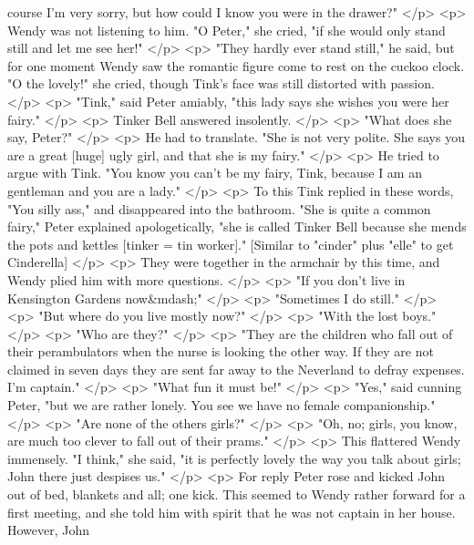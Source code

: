       course I'm very sorry, but how could I know you were in the drawer?"
    </p>
    <p>
      Wendy was not listening to him. "O Peter," she cried, "if she would only
      stand still and let me see her!"
    </p>
    <p>
      "They hardly ever stand still," he said, but for one moment Wendy saw the
      romantic figure come to rest on the cuckoo clock. "O the lovely!" she
      cried, though Tink's face was still distorted with passion.
    </p>
    <p>
      "Tink," said Peter amiably, "this lady says she wishes you were her
      fairy."
    </p>
    <p>
      Tinker Bell answered insolently.
    </p>
    <p>
      "What does she say, Peter?"
    </p>
    <p>
      He had to translate. "She is not very polite. She says you are a great
      [huge] ugly girl, and that she is my fairy."
    </p>
    <p>
      He tried to argue with Tink. "You know you can't be my fairy, Tink,
      because I am an gentleman and you are a lady."
    </p>
    <p>
      To this Tink replied in these words, "You silly ass," and disappeared into
      the bathroom. "She is quite a common fairy," Peter explained
      apologetically, "she is called Tinker Bell because she mends the pots and
      kettles [tinker = tin worker]." [Similar to "cinder" plus "elle" to get
      Cinderella]
    </p>
    <p>
      They were together in the armchair by this time, and Wendy plied him with
      more questions.
    </p>
    <p>
      "If you don't live in Kensington Gardens now&mdash;"
    </p>
    <p>
      "Sometimes I do still."
    </p>
    <p>
      "But where do you live mostly now?"
    </p>
    <p>
      "With the lost boys."
    </p>
    <p>
      "Who are they?"
    </p>
    <p>
      "They are the children who fall out of their perambulators when the nurse
      is looking the other way. If they are not claimed in seven days they are
      sent far away to the Neverland to defray expenses. I'm captain."
    </p>
    <p>
      "What fun it must be!"
    </p>
    <p>
      "Yes," said cunning Peter, "but we are rather lonely. You see we have no
      female companionship."
    </p>
    <p>
      "Are none of the others girls?"
    </p>
    <p>
      "Oh, no; girls, you know, are much too clever to fall out of their prams."
    </p>
    <p>
      This flattered Wendy immensely. "I think," she said, "it is perfectly
      lovely the way you talk about girls; John there just despises us."
    </p>
    <p>
      For reply Peter rose and kicked John out of bed, blankets and all; one
      kick. This seemed to Wendy rather forward for a first meeting, and she
      told him with spirit that he was not captain in her house. However, John

